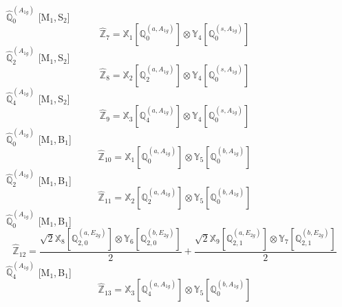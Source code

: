 \documentclass[fleqn,10pt,landscape]{article}
\begin{document}
\begin{itemize}
\vspace{4mm}
\noindent {} $\,\,\,\hat{\mathbb{Q}}_{0}^{(A_{1g})}$ [M$_{1}$,\,S$_{2}$]
\begin{dmath*}
\hat{\mathbb{Z}}_{7}=\mathbb{X}_{1}[\mathbb{Q}_{0}^{(a,A_{1g})}] \otimes\mathbb{Y}_{4}[\mathbb{Q}_{0}^{(s,A_{1g})}]
\end{dmath*}
\vspace{4mm}
\noindent {} $\,\,\,\hat{\mathbb{Q}}_{2}^{(A_{1g})}$ [M$_{1}$,\,S$_{2}$]
\begin{dmath*}
\hat{\mathbb{Z}}_{8}=\mathbb{X}_{2}[\mathbb{Q}_{2}^{(a,A_{1g})}] \otimes\mathbb{Y}_{4}[\mathbb{Q}_{0}^{(s,A_{1g})}]
\end{dmath*}
\vspace{4mm}
\noindent {} $\,\,\,\hat{\mathbb{Q}}_{4}^{(A_{1g})}$ [M$_{1}$,\,S$_{2}$]
\begin{dmath*}
\hat{\mathbb{Z}}_{9}=\mathbb{X}_{3}[\mathbb{Q}_{4}^{(a,A_{1g})}] \otimes\mathbb{Y}_{4}[\mathbb{Q}_{0}^{(s,A_{1g})}]
\end{dmath*}
\vspace{4mm}
\noindent {} $\,\,\,\hat{\mathbb{Q}}_{0}^{(A_{1g})}$ [M$_{1}$,\,B$_{1}$]
\begin{dmath*}
\hat{\mathbb{Z}}_{10}=\mathbb{X}_{1}[\mathbb{Q}_{0}^{(a,A_{1g})}] \otimes\mathbb{Y}_{5}[\mathbb{Q}_{0}^{(b,A_{1g})}]
\end{dmath*}
\vspace{4mm}
\noindent {} $\,\,\,\hat{\mathbb{Q}}_{2}^{(A_{1g})}$ [M$_{1}$,\,B$_{1}$]
\begin{dmath*}
\hat{\mathbb{Z}}_{11}=\mathbb{X}_{2}[\mathbb{Q}_{2}^{(a,A_{1g})}] \otimes\mathbb{Y}_{5}[\mathbb{Q}_{0}^{(b,A_{1g})}]
\end{dmath*}
\vspace{4mm}
\noindent {} $\,\,\,\hat{\mathbb{Q}}_{0}^{(A_{1g})}$ [M$_{1}$,\,B$_{1}$]
\begin{dmath*}
\hat{\mathbb{Z}}_{12}=\frac{\sqrt{2} \mathbb{X}_{8}[\mathbb{Q}_{2,0}^{(a,E_{2g})}] \otimes\mathbb{Y}_{6}[\mathbb{Q}_{2,0}^{(b,E_{2g})}]}{2} + \frac{\sqrt{2} \mathbb{X}_{9}[\mathbb{Q}_{2,1}^{(a,E_{2g})}] \otimes\mathbb{Y}_{7}[\mathbb{Q}_{2,1}^{(b,E_{2g})}]}{2}
\end{dmath*}
\vspace{4mm}
\noindent {} $\,\,\,\hat{\mathbb{Q}}_{4}^{(A_{1g})}$ [M$_{1}$,\,B$_{1}$]
\begin{dmath*}
\hat{\mathbb{Z}}_{13}=\mathbb{X}_{3}[\mathbb{Q}_{4}^{(a,A_{1g})}] \otimes\mathbb{Y}_{5}[\mathbb{Q}_{0}^{(b,A_{1g})}]

\end{dmath*}
\end{itemize}
\end{document}
